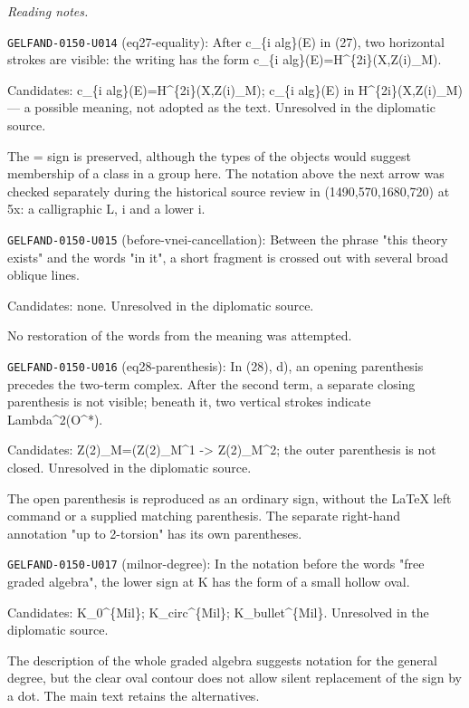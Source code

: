 \par\smallskip\noindent\textit{Reading notes.}\par
\noindent\texttt{GELFAND-0150-U014} (eq27-equality): After c\_\{i alg\}(E) in (27), two horizontal strokes are visible: the writing has the form c\_\{i alg\}(E)=H\textasciicircum{}\{2i\}(X,Z(i)\_M).\par
Candidates: c\_\{i alg\}(E)=H\textasciicircum{}\{2i\}(X,Z(i)\_M); c\_\{i alg\}(E) in H\textasciicircum{}\{2i\}(X,Z(i)\_M) --- a possible meaning, not adopted as the text. Unresolved in the diplomatic source.\par
The = sign is preserved, although the types of the objects would suggest membership of a class in a group here. The notation above the next arrow was checked separately during the historical source review in (1490,570,1680,720) at 5x: a calligraphic L, i and a lower i.\par
\noindent\texttt{GELFAND-0150-U015} (before-vnei-cancellation): Between the phrase "this theory exists" and the words "in it", a short fragment is crossed out with several broad oblique lines.\par
Candidates: none. Unresolved in the diplomatic source.\par
No restoration of the words from the meaning was attempted.\par
\noindent\texttt{GELFAND-0150-U016} (eq28-parenthesis): In (28), d), an opening parenthesis precedes the two-term complex. After the second term, a separate closing parenthesis is not visible; beneath it, two vertical strokes indicate Lambda\textasciicircum{}2(O\textasciicircum{}*).\par
Candidates: Z(2)\_M=(Z(2)\_M\textasciicircum{}1 -> Z(2)\_M\textasciicircum{}2; the outer parenthesis is not closed. Unresolved in the diplomatic source.\par
The open parenthesis is reproduced as an ordinary sign, without the LaTeX left command or a supplied matching parenthesis. The separate right-hand annotation "up to 2-torsion" has its own parentheses.\par
\noindent\texttt{GELFAND-0150-U017} (milnor-degree): In the notation before the words "free graded algebra", the lower sign at K has the form of a small hollow oval.\par
Candidates: K\_0\textasciicircum{}\{Mil\}; K\_circ\textasciicircum{}\{Mil\}; K\_bullet\textasciicircum{}\{Mil\}. Unresolved in the diplomatic source.\par
The description of the whole graded algebra suggests notation for the general degree, but the clear oval contour does not allow silent replacement of the sign by a dot. The main text retains the alternatives.\par
